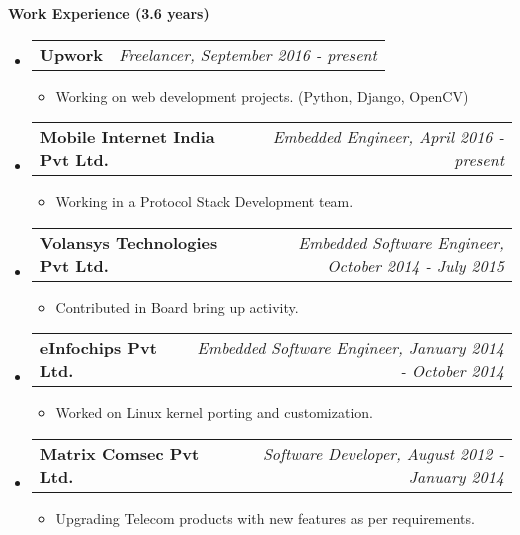 \documentclass[letterpaper,10pt]{article}
\makeatletter
\newcommand{\resitem}[1]{\item #1 \vspace{-2pt}}
\newcommand{\resheading}[1]{{\large \colorbox{mygrey}{\begin{minipage}{\textwidth}{\textbf{#1 \vphantom{p\^{E}}}}\end{minipage}}}}
\newcommand{\ressubheading}[4]{
\begin{tabular*}{7.0in}{l@{\extracolsep{\fill}}r}
		\textbf{#1} & \textit{#4} \\
\end{tabular*}\vspace{-6pt}}
\makeatother
\begin{document}
\resheading{Work Experience (3.6 years)}
\begin{itemize}

\item
	\ressubheading{Upwork}{Remote}{}{Freelancer, September 2016 - present}
	\begin{itemize}
		\resitem{Working on web development projects.}(Python, Django, OpenCV)
	\end{itemize}

\item
	\ressubheading{Mobile Internet India Pvt Ltd.}{Ahmedabad, India}{}{Embedded Engineer, April 2016 - present}
	\begin{itemize}
		\resitem{Working in a Protocol Stack Development team.}
	\end{itemize}

\item
	\ressubheading{Volansys Technologies Pvt Ltd.}{Ahmedabad, India}{}{Embedded Software Engineer, October 2014 - July 2015}
	\begin{itemize}
		\resitem{Contributed in Board bring up activity.}
	\end{itemize}

\item
	\ressubheading{eInfochips Pvt Ltd.}{Ahmedabad, India}{}{Embedded Software Engineer, January 2014 - October 2014}
	\begin{itemize}
		\resitem{Worked on Linux kernel porting and customization.}
	\end{itemize}

\item
	\ressubheading{Matrix Comsec Pvt Ltd.}{Ahmedabad, India}{}{Software Developer, August 2012 - January 2014}
	\begin{itemize}
		\resitem{Upgrading Telecom products with new features as per requirements.}
	\end{itemize}

\end{itemize}
\end{document}
